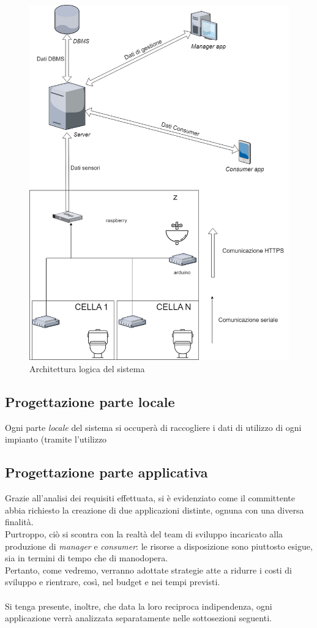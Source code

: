\documentclass[12pt]{article}
\begin{document}
\begin{figure}[h!]
\centering
  \includegraphics[scale=0.33]{img/architettura_logica-report.png}
  \caption{Architettura logica del sistema}
\end{figure}
\subsection{Progettazione parte locale}
Ogni parte \textit{locale} del sistema si occuperà di raccogliere i dati di utilizzo di ogni impianto (tramite l'utilizzo  
\newpage
\subsection{Progettazione parte applicativa}
Grazie all'analisi dei requisiti effettuata, si è evidenziato come il committente abbia richiesto la creazione di due applicazioni distinte, ognuna con una diversa finalità.\\
Purtroppo, ciò si scontra con la realtà del team di sviluppo incaricato alla produzione di \textit{manager} e \textit{consumer}: le risorse a disposizione sono piuttosto esigue, sia in termini di tempo che di manodopera.\\
Pertanto, come vedremo, verranno adottate strategie atte a ridurre i costi di sviluppo e rientrare, così, nel budget e nei tempi previsti.\\\\
Si tenga presente, inoltre, che data la loro reciproca indipendenza, ogni applicazione verrà analizzata separatamente nelle sottosezioni seguenti.
\end{document}
